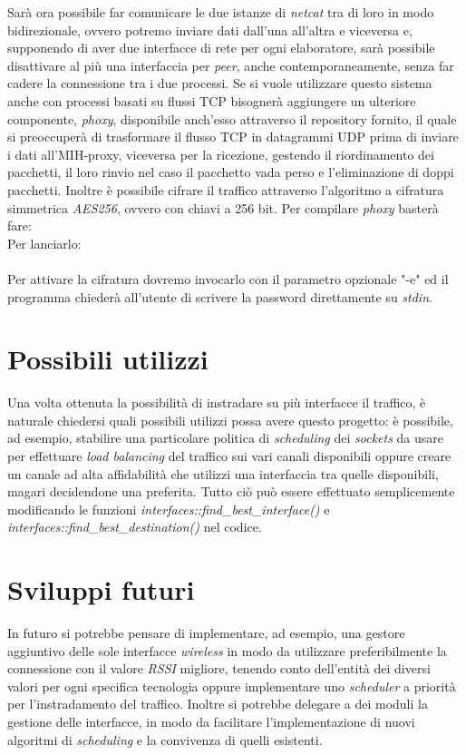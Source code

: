 Sarà ora possibile far comunicare le due istanze di {\em netcat} tra di loro in modo bidirezionale, ovvero potremo inviare dati dall'una all'altra e viceversa e, supponendo di aver due interfacce di rete per ogni elaboratore, sarà possibile disattivare al più una interfaccia per {\em peer}, anche contemporaneamente, senza far cadere la connessione tra i due processi. Se si vuole utilizzare questo sistema anche con processi basati su flussi TCP bisognerà aggiungere un ulteriore componente, {\em phoxy}, disponibile anch'esso attraverso il repository fornito, il quale si preoccuperà di trasformare il flusso TCP in datagrammi UDP prima di inviare i dati all'MIH-proxy, viceversa per la ricezione, gestendo il riordinamento dei pacchetti, il loro rinvio nel caso il pacchetto vada perso e l'eliminazione di doppi pacchetti. Inoltre è possibile cifrare il traffico attraverso l'algoritmo a cifratura simmetrica {\em AES256}, ovvero con chiavi a 256 bit. Per compilare {\em phoxy} basterà fare:\\
Per lanciarlo:\\
\\
Per attivare la cifratura dovremo invocarlo con il parametro opzionale "-e" ed il programma chiederà all'utente di scrivere la password direttamente su {\em stdin}.
\newpage
\section{Possibili utilizzi}
Una volta ottenuta la possibilità di instradare su più interfacce il traffico, è naturale chiedersi quali possibili utilizzi possa avere questo progetto:
è possibile, ad esempio, stabilire una particolare politica di {\em scheduling} dei {\em sockets} da usare per effettuare {\em load balancing} del traffico sui vari canali disponibili oppure creare un canale ad alta affidabilità che utilizzi una interfaccia tra quelle disponibili, magari decidendone una preferita. Tutto ciò può essere effettuato semplicemente modificando le funzioni {\em interfaces::find\_best\_interface()} e {\em interfaces::find\_best\_destination()} nel codice.
\section{Sviluppi futuri}
In futuro si potrebbe pensare di implementare, ad esempio, una gestore aggiuntivo delle sole interfacce {\em wireless} in modo da utilizzare preferibilmente la connessione con il valore {\em RSSI} migliore, tenendo conto dell'entità dei diversi valori per ogni specifica tecnologia oppure implementare uno {\em scheduler} a priorità per l'instradamento del traffico. Inoltre si potrebbe delegare a dei moduli la gestione delle interfacce, in modo da facilitare l'implementazione di nuovi algoritmi di {\em scheduling} e la convivenza di quelli esistenti.
